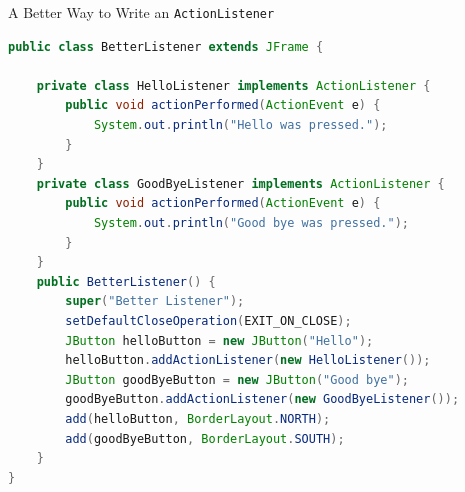 \documentclass{beamer}
\begin{document}
\begin{frame}[fragile]{A Better Way to Write an {\tt ActionListener}}

\vspace{-.1in}
\begin{lstlisting}[language=Java]
public class BetterListener extends JFrame {

    private class HelloListener implements ActionListener {
        public void actionPerformed(ActionEvent e) {
            System.out.println("Hello was pressed.");
        }
    }
    private class GoodByeListener implements ActionListener {
        public void actionPerformed(ActionEvent e) {
            System.out.println("Good bye was pressed.");
        }
    }
    public BetterListener() {
        super("Better Listener");
        setDefaultCloseOperation(EXIT_ON_CLOSE);
        JButton helloButton = new JButton("Hello");
        helloButton.addActionListener(new HelloListener());
        JButton goodByeButton = new JButton("Good bye");
        goodByeButton.addActionListener(new GoodByeListener());
        add(helloButton, BorderLayout.NORTH);
        add(goodByeButton, BorderLayout.SOUTH);
    }
}
\end{lstlisting}


\end{frame}







\end{document}
